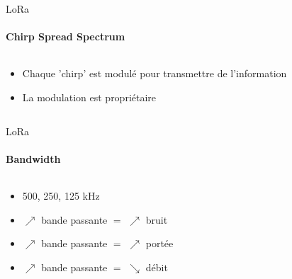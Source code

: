 \begin{frame}{LoRa}
\framesubtitle{Chirp Spread Spectrum}
\begin{columns}
  \begin{column}{0.5\textwidth}
    \begin{itemize}
      \item Chaque 'chirp' est modulé pour transmettre de l'information
      \item La modulation est propriétaire
    \end{itemize}
  \end{column}
  \begin{column}{0.5\textwidth}
    \begin{center}
    \end{center}
  \end{column}
\end{columns}
\end{frame}

\begin{frame}{LoRa}
\framesubtitle{Bandwidth}
\begin{columns}
\begin{column}{0.5\textwidth}
    
\begin{itemize}
  \item 500, 250, 125 kHz
  \item $\nearrow$ bande passante $=$ $\nearrow$ bruit
  \item $\nearrow$ bande passante $=$ $\nearrow$ portée
  \item $\nearrow$ bande passante $=$ $\searrow$ débit
\end{itemize}
\end{column}
\begin{column}{0.5\textwidth}
  
\end{column}
\end{columns}

\end{frame}

